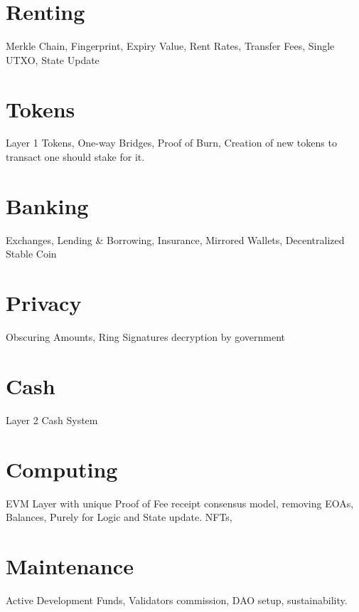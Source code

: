 \documentclass[a4paper,11pt]{article}
\begin{document}
\section{Renting}
Merkle Chain, Fingerprint, Expiry Value, Rent Rates, Transfer Fees, Single UTXO, State Update

\section{Tokens}
Layer 1 Tokens, One-way Bridges, Proof of Burn, Creation of new tokens to transact one should stake for it.

\section{Banking}
Exchanges, Lending \& Borrowing, Insurance, Mirrored Wallets, Decentralized Stable Coin

\section{Privacy}
Obscuring Amounts, Ring Signatures decryption by government

\section{Cash}
Layer 2 Cash System 

\section{Computing}
EVM Layer with unique Proof of Fee receipt consensus model, removing EOAs, Balances, Purely for Logic and State update. NFTs, 

\section{Maintenance}
Active Development Funds, Validators commission, DAO setup, sustainability.

\end{document}
